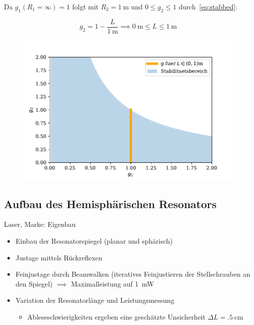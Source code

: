 \documentclass[10pt, aspectratio=169]{beamer}
\begin{document}
\begin{frame}
  Da \(g_1(R_1=\infty)=1\) folgt mit
  \(R_2=\SI{1}{\meter}\) und \(0\leq g_2\leq 1\)
  durch~\ref{eq:stabbed}:

  \begin{equation}
    \label{eq:stabber}
    g_2=1-\frac{L}{\SI{1}{\meter}}\implies\SI{0}{\meter}\leq L \leq \SI{1}{\meter}
  \end{equation}

  \begin{figure}[H]\centering
    \includegraphics[width=.5\columnwidth]{figs/stabdiag.pdf}
  \end{figure}
\end{frame}


\subsection{Aufbau des Hemisph\"arischen Resonators}
\begin{frame}{Laser, Marke: Eigenbau}
  \begin{itemize}
  \item<1-> Einbau der Resonatorspiegel (planar und sph\"arisch)
  \item<2-> Justage mittels R\"uckreflexen
  \item<3-> Feinjustage durch Beamwalken (iteratives Feinjustieren der
    Stellschrauben an den Spiegel) \(\implies\) Maximalleistung auf
    \SI{1}{\milli\watt}
  \item<4-> Variation der Resonatorl\"ange und Leistungsmessung
    \begin{itemize}
    \item Ableseschwierigkeiten ergeben eine gesch\"atzte Unsicherheit
      \(\Delta L = \SI{.5}{\centi\meter}\)
    \end{itemize}
  \end{itemize}

\end{frame}
\end{document}
